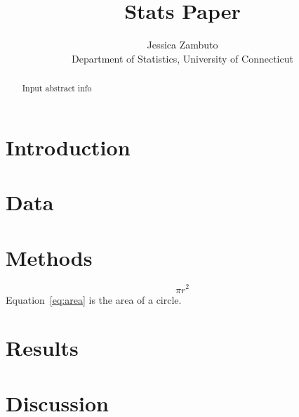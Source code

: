 \documentclass[12pt]{article}
\title{Stats Paper}
\author{Jessica Zambuto\\
Department of Statistics, University of Connecticut}
\begin{document}
\maketitle

\begin{abstract}
Input abstract info 	
\end{abstract}

\section{Introduction}
\label{sec:intro}


\section{Data}
\label{sec:data}

\section{Methods}
\label{sec:meth}
\begin{equation}
	\label{eq:area}
	\pi r^2
\end{equation}
Equation~\eqref{eq:area} is the area of a circle.

\section{Results}
\label{sec:results}

\section{Discussion}
\label{sec:disc}
\end{document}
